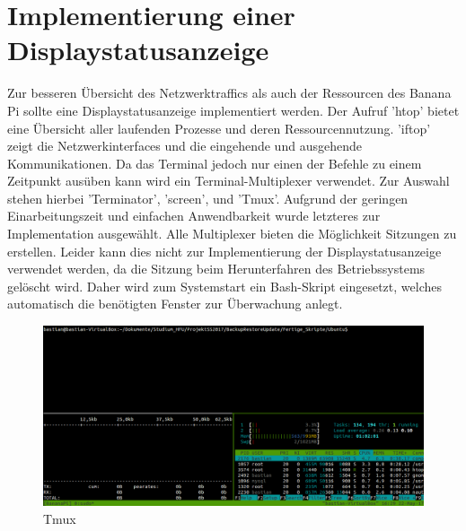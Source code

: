 \section{Implementierung einer Displaystatusanzeige}
Zur besseren Übersicht des Netzwerktraffics als auch der Ressourcen des Banana Pi sollte eine Displaystatusanzeige implementiert werden. Der Aufruf 'htop' bietet eine Übersicht aller laufenden Prozesse und deren Ressourcennutzung. 'iftop' zeigt die Netzwerkinterfaces und die eingehende und ausgehende Kommunikationen. Da das Terminal jedoch nur einen der Befehle zu einem Zeitpunkt ausüben kann wird ein Terminal-Multiplexer verwendet. Zur Auswahl stehen hierbei 'Terminator', 'screen', und 'Tmux'. Aufgrund der geringen Einarbeitungszeit und einfachen Anwendbarkeit wurde letzteres zur Implementation ausgewählt. Alle Multiplexer bieten die Möglichkeit Sitzungen zu erstellen. Leider kann dies nicht zur Implementierung der Displaystatusanzeige verwendet werden, da die Sitzung beim Herunterfahren des Betriebssystems gelöscht wird. Daher wird zum Systemstart ein Bash-Skript eingesetzt, welches automatisch die benötigten Fenster zur Überwachung anlegt.
\begin{figure}[ht]
\includegraphics[width=\textwidth]{pictures/Bastian/Tmux}
\caption{Tmux}
\end{figure}

